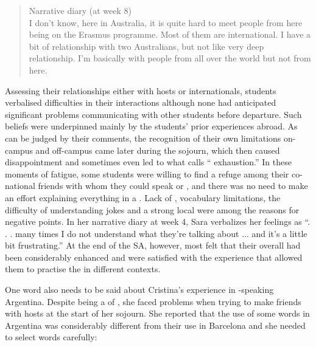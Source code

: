 \documentclass[output=paper]{langsci/langscibook}
\begin{document}
\begin{quote}
Narrative diary (at week 8)
\smallskip\\
I don't know, here in Australia, it is quite hard to meet people from here being on the Erasmus programme. Most of them are international. I have a bit of relationship with two Australians, but not like very deep relationship. I'm basically with people from all over the world but not from here.  
\end{quote}

Assessing their relationships either with hosts or internationals, students verbalised  difficulties in their interactions although none had anticipated significant problems communicating with other students  before departure. Such beliefs were underpinned mainly by the students’ prior experiences abroad. As can be judged by their comments, the recognition of their own  limitations on-campus and off-campus came later during the sojourn, which then caused disappointment and sometimes even led to what \citet{Beaven2012} calls “ exhaustion.” In these moments of fatigue, some students were willing to find a refuge among their co-national friends with whom they could speak  or , and there was no need to make an effort explaining everything in a . Lack of , vocabulary limitations, the difficulty of understanding jokes and a strong local  were among the reasons for negative  points. In her narrative diary at week 4, Sara verbalizes her feelings as “. . . many times I do not understand what they're talking about ... and it's a little bit frustrating.” At the end of the SA, however, most felt that their overall  had been considerably enhanced and were satisfied with the experience that allowed them to practise the  in different contexts. 

One word also needs to be said about Cristina’s experience in -speak\-ing Argentina. Despite being a  of , she faced  problems when trying to make friends with hosts at the start of her sojourn. She reported that the use of some words in Argentina was considerably different from their use in Barcelona and she needed to select words carefully:
\end{document}
